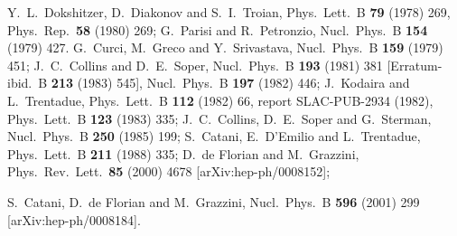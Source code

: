 \documentclass[12pt]{article}
\begin{document}
\begin{thebibliography}{99}
  
Y.~L.~Dokshitzer, D.~Diakonov and S.~I.~Troian,
Phys.\ Lett.\  B {\bf 79} (1978) 269,
Phys.\ Rep.\  {\bf 58} (1980) 269;
G.~Parisi and R.~Petronzio,
Nucl.\ Phys.\ B {\bf 154} (1979) 427.
G.~Curci, M.~Greco and Y.~Srivastava,
Nucl.\ Phys.\ B {\bf 159} (1979) 451;
J.~C.~Collins and D.~E.~Soper,
Nucl.\ Phys.\ B {\bf 193} (1981) 381
[Erratum-ibid.\ B {\bf 213} (1983) 545],
Nucl.\ Phys.\ B {\bf 197} (1982) 446;
J.~Kodaira and L.~Trentadue,
Phys.\ Lett.\ B {\bf 112} (1982) 66,
report SLAC-PUB-2934 (1982),
Phys.\ Lett.\ B {\bf 123} (1983) 335;
J.~C.~Collins, D.~E.~Soper and G.~Sterman,
Nucl.\ Phys.\ B {\bf 250} (1985) 199;
S.~Catani, E.~D'Emilio and L.~Trentadue,
Phys.\ Lett.\ B {\bf 211} (1988) 335;
  D.~de Florian and M.~Grazzini,
  Phys.\ Rev.\ Lett.\  {\bf 85} (2000) 4678
[arXiv:hep-ph/0008152];

  S.~Catani, D.~de Florian and M.~Grazzini,
  Nucl.\ Phys.\  B {\bf 596} (2001) 299
[arXiv:hep-ph/0008184].


\end{thebibliography}
\end{document}
